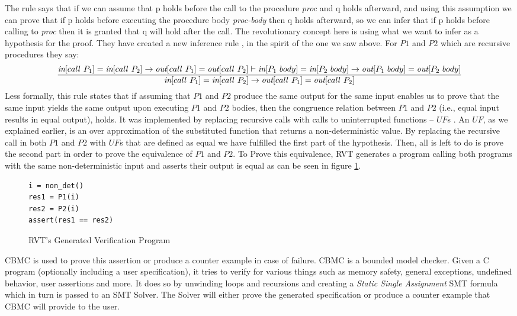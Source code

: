 The rule says that if we can assume that {p} holds before the call to the procedure \emph{proc} and {q} holds afterward, and using this assumption we can prove that if {p} holds before executing the procedure body \emph{proc-body} then {q} holds afterward, so we can infer that if {p} holds before calling to \emph{proc} then it is granted that {q} will hold after the call. The revolutionary concept here is using what we want to infer as a hypothesis for the proof. They have created a new inference rule \cite{DBLP:conf/dac/GodlinS09}, in the spirit of the one we saw above. For $P1$ and $P2$ which are recursive procedures they say:
\begin{equation}
 {\frac {{\emph{in}[call\ P_1]=\emph{in}[call\ P_2]\rightarrow \emph{out}[call\ P_1]=\emph{out}[call\ P_2]} \vdash{\emph{in}[P_1\ body]=\emph{in}[P_2\ body]\rightarrow \emph{out}[P_1\ body]=\emph{out}[P_2\ body]} }
{{\emph{in}[call\ P_1]=\emph{in}[call\ P_2]\rightarrow \emph{out}[call\ P_1]=\emph{out}[call\ P_2]}}} 
\end{equation}
Less formally, this rule states that if  assuming that $P1$ and $P2$ produce the same output for the same input enables us to prove that the same input yields the same output upon executing $P1$ and $P2$ bodies, then the congruence relation between $P1$ and $P2$ (i.e., equal input results in equal output), holds. It was implemented by replacing recursive calls with calls to uninterrupted functions – $UF$s . An $UF$, as we explained earlier, is an over approximation of the substituted function that returns a non-deterministic value. By replacing the recursive call in both $P1$ and $P2$ with $UF$s that are defined as equal we have fulfilled the first part of the hypothesis. Then, all is left to do is prove the second part in order to prove the equivalence of $P1$ and $P2$. To Prove this equivalence, RVT generates a program calling both programs with the same non-deterministic input and asserts their output is equal as can be seen in figure \ref{fig:rvtmainprogram}.
\begin{figure}[h]
\begin{center}
\begin{minipage}{7 cm}

\begin{lstlisting}
i = non_det()
res1 = P1(i)
res2 = P2(i)
assert(res1 == res2) 
\end{lstlisting}
\end{minipage}
\caption{RVT's Generated Verification Program}
\label{fig:rvtmainprogram}
\end{center}
\end{figure}
CBMC is used to prove this assertion or produce a counter example in case of failure. CBMC is a bounded model checker. Given a C program (optionally including a user specification), it tries to verify for various things such as memory safety, general exceptions, undefined behavior, user assertions and more. It does so by unwinding loops and recursions and creating a \emph{Static Single Assignment} SMT formula which in turn is passed to an SMT Solver. The Solver will either prove the generated specification or produce a counter example that CBMC will provide to the user. 

